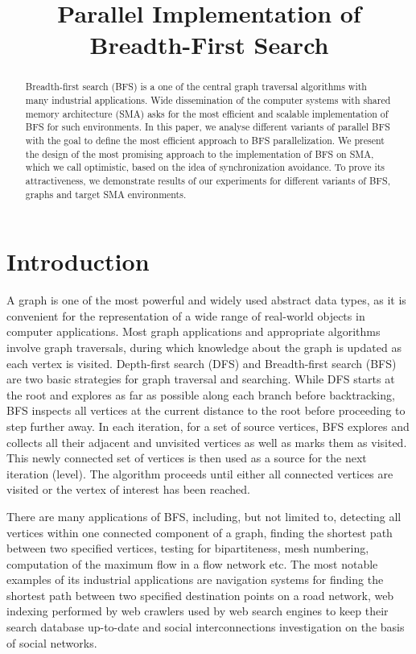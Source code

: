 \documentclass[letterpaper]{article}
\title{Parallel Implementation of Breadth-First Search} %
\begin{document}
	\maketitle

	\begin{abstract} 
		Breadth-first search (BFS) is a one of the central graph traversal algorithms with many industrial applications.
		Wide dissemination of the computer systems with shared memory architecture (SMA) asks for the most efficient and scalable implementation of BFS for such environments. 
		In this paper, we analyse different variants of parallel BFS with the goal to define the most efficient approach to BFS parallelization.
		We present the design of the most promising approach to the implementation of BFS on SMA, which we call optimistic, based on the idea of synchronization avoidance.
		To prove its attractiveness, we demonstrate results of our experiments for different variants of BFS, graphs and target SMA environments.
	\end{abstract}

	\section{Introduction}\label{sec:intro} %
		A graph is one of the most powerful and widely used abstract data types, as it is convenient for the representation of a wide range of real-world objects in computer applications.
		Most graph applications and appropriate algorithms involve graph traversals, during which knowledge about the graph is updated as each vertex is visited. 
		Depth-first search (DFS) and Breadth-first search (BFS) are two basic strategies for graph traversal and searching.
		While DFS starts at the root and explores as far as possible along each branch before backtracking, BFS inspects all vertices at the current distance to the root before proceeding to step further away. 
		In each iteration, for a set of source vertices, BFS explores and collects all their adjacent and unvisited vertices as well as marks them as visited.  
		This newly connected set of vertices is then used as a source for the next iteration (level).
		The algorithm proceeds until either all connected vertices are visited or the vertex of interest has been reached.
		
		There are many applications of BFS, including, but not limited to, detecting all vertices within one connected component of a graph, finding the shortest path between two specified vertices, testing for bipartiteness, mesh numbering, computation of the maximum flow in a flow network etc.
		The most notable examples of its industrial applications are navigation systems for finding the shortest path between two specified destination points on a road network, web indexing performed by web crawlers used by web search engines to keep their search database up-to-date and social interconnections investigation on the basis of social networks. 
		
\end{document}
